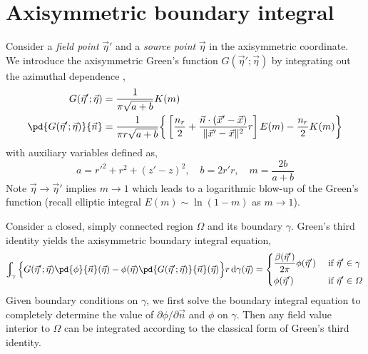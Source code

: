 \documentclass{jfm}
\begin{document}
\section{Axisymmetric boundary integral}
Consider a \textit{field point} $\vec{\eta}'$ and a \textit{source point} $\vec{\eta}$ in the axisymmetric coordinate.
We introduce the axisymmetric Green's function $G(\vec{\eta}';\vec{\eta})$ by integrating out the azimuthal
dependence \citep{Lennon79},
\begin{align}
G(\vec{\eta}';\vec{\eta})&=\frac{1}{\pi\sqrt{a+b}}K(m)\\
\pd{G(\vec{\eta}';\vec{\eta})}{\vec{n}}&=
\frac{1}{\pi r\sqrt{a+b}}\bigg\{
\left[\frac{n_r}{2}+\frac{\vec{n}\cdot(\vec{x}'-\vec{x})}{\|\vec{x}'-\vec{x}\|^2}r\right]E(m)
-\frac{n_r}{2}K(m)\bigg\}
\end{align}
with auxiliary variables defined as,
\begin{equation}
a=r'^2+r^2+(z'-z)^2,\quad b = 2 r' r,\quad m =\frac{2 b}{a+b}
\end{equation}
Note $\vec{\eta}\to\vec{\eta}'$ implies $m\to 1$ which leads to a logarithmic blow-up of the Green's function
(recall elliptic integral $E(m)\sim \ln (1- m)$ as $m\to1$).


Consider a closed, simply connected region $\Omega$
and its boundary $\gamma$.
Green's third identity yields the axisymmetric boundary integral equation,
\begin{equation}\label{eq:bie}
\int_{\gamma}
\Big\{
G(\vec{\eta}';\vec{\eta})\pd{\phi}{\vec{n}}(\vec{\eta})-
\phi(\vec{\eta})\pd{G(\vec{\eta}';\vec{\eta})}{\vec{n}}(\vec{\eta})
\Big\}
 r \,\mathrm{d}\gamma(\vec{\eta})=\left\{
\begin{aligned}
&\frac{\beta(\vec{\eta}')}{2\pi}\phi(\vec{\eta}')&&\textrm{ if }\vec{\eta}'\in\gamma\\
&\phi(\vec{\eta}')&&\textrm{ if }\vec{\eta}'\in\Omega
\end{aligned}\right.
\end{equation}
Given boundary conditions on $\gamma$,
we first solve the boundary integral equation 
to completely determine the value of $\partial\phi/\partial \vec{n}$
and $\phi$ on $\gamma$.
Then any field value interior to $\Omega$ can be integrated 
according to the classical form of Green's third identity.
\end{document}
